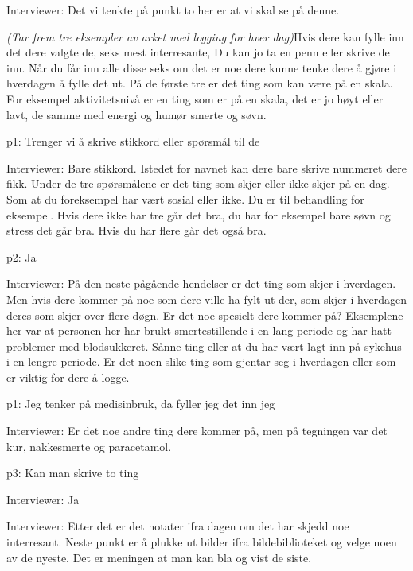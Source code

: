 \documentclass[11pt, norsk, a4paper]{article}
\begin{document}
\textcolor{myBlue} {Interviewer: }Det vi tenkte på punkt to her er at vi skal se på denne. 

\textcolor{myGrey}{\textit{(Tar frem tre eksempler av arket med logging for hver dag)}}Hvis dere kan fylle inn det dere valgte de, seks mest interresante, Du kan jo ta en penn eller skrive de inn. Når du får inn alle disse seks om det er noe dere kunne tenke dere å gjøre i hverdagen å fylle det ut. På de første tre er det ting som kan være på en skala. For eksempel aktivitetsnivå er en ting som er på en skala, det er jo høyt eller lavt, de samme med energi og humør smerte og søvn.


\textcolor{myGreen} {p1: }Trenger vi å skrive stikkord eller spørsmål til de


\textcolor{myBlue} {Interviewer: }Bare stikkord. Istedet for navnet kan dere bare skrive nummeret dere fikk. Under de tre spørsmålene er det ting som skjer eller ikke skjer på en dag. Som at du foreksempel har vært sosial eller ikke. Du er til behandling for eksempel. Hvis dere ikke har tre går det bra, du har for eksempel bare søvn og stress det går bra. Hvis du har flere går det også bra.


\textcolor{myYellow} {p2: }Ja


\textcolor{myBlue} {Interviewer: }På den neste pågående hendelser er det ting som skjer i hverdagen. Men hvis dere kommer på noe som dere ville ha fylt ut der, som skjer i hverdagen deres som skjer over flere døgn. Er det noe spesielt dere kommer på? Eksemplene her var at personen her har brukt smertestillende i en lang periode og har hatt problemer med blodsukkeret. Sånne ting eller at du har vært lagt inn på sykehus i en lengre periode. Er det noen slike ting som gjentar seg i hverdagen eller som er viktig for dere å logge. 


\textcolor{myGreen} {p1: }Jeg tenker på medisinbruk, da fyller jeg det inn jeg


\textcolor{myBlue} {Interviewer: }Er det noe andre ting dere kommer på, men på tegningen var det kur, nakkesmerte og paracetamol.


\textcolor{myR} {p3: }Kan man skrive to ting


\textcolor{myBlue} {Interviewer: }Ja


\textcolor{myBlue} {Interviewer: }Etter det er det notater ifra dagen om det har skjedd noe interresant. Neste punkt er å plukke ut bilder ifra bildebiblioteket og velge noen av de nyeste. Det er meningen at man kan bla og vist de siste. 
\end{document}
